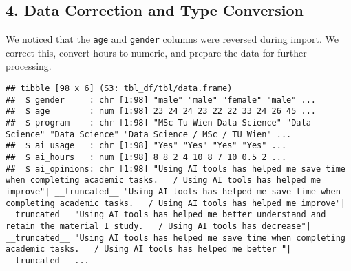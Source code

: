 \documentclass[
]{article}
\newenvironment{Shaded}{\begin{snugshade}}{\end{snugshade}}
\newcommand{\CommentTok}[1]{\textcolor[rgb]{0.56,0.35,0.01}{\textit{#1}}}
\newcommand{\DecValTok}[1]{\textcolor[rgb]{0.00,0.00,0.81}{#1}}
\newcommand{\FloatTok}[1]{\textcolor[rgb]{0.00,0.00,0.81}{#1}}
\newcommand{\FunctionTok}[1]{\textcolor[rgb]{0.13,0.29,0.53}{\textbf{#1}}}
\newcommand{\NormalTok}[1]{#1}
\newcommand{\OtherTok}[1]{\textcolor[rgb]{0.56,0.35,0.01}{#1}}
\newcommand{\SpecialCharTok}[1]{\textcolor[rgb]{0.81,0.36,0.00}{\textbf{#1}}}
\newcommand{\StringTok}[1]{\textcolor[rgb]{0.31,0.60,0.02}{#1}}
\begin{document}
\subsection{4. Data Correction and Type
Conversion}\label{data-correction-and-type-conversion}

We noticed that the \texttt{age} and \texttt{gender} columns were
reversed during import. We correct this, convert hours to numeric, and
prepare the data for further processing.

\begin{Shaded}
\end{Shaded}

\begin{verbatim}
## tibble [98 x 6] (S3: tbl_df/tbl/data.frame)
##  $ gender     : chr [1:98] "male" "male" "female" "male" ...
##  $ age        : num [1:98] 23 24 24 23 22 22 33 24 26 45 ...
##  $ program    : chr [1:98] "MSc Tu Wien Data Science" "Data Science" "Data Science" "Data Science / MSc / TU Wien" ...
##  $ ai_usage   : chr [1:98] "Yes" "Yes" "Yes" "Yes" ...
##  $ ai_hours   : num [1:98] 8 8 2 4 10 8 7 10 0.5 2 ...
##  $ ai_opinions: chr [1:98] "Using AI tools has helped me save time when completing academic tasks.   / Using AI tools has helped me improve"| __truncated__ "Using AI tools has helped me save time when completing academic tasks.   / Using AI tools has helped me improve"| __truncated__ "Using AI tools has helped me better understand and retain the material I study.   / Using AI tools has decrease"| __truncated__ "Using AI tools has helped me save time when completing academic tasks.   / Using AI tools has helped me better "| __truncated__ ...
\end{verbatim}
\end{document}
